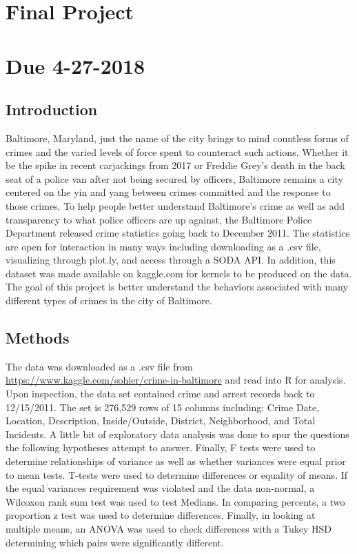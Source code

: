 \documentclass{article}
\newlength\tindent
\renewcommand{\indent}{\hspace*{\tindent}}
\begin{document}
\section*{Final Project}
\section*{Due 4-27-2018}
\subsection*{Introduction}

\indent Baltimore, Maryland, just the name of the city brings to mind countless forms of crimes and the varied levels of force spent to counteract such actions.  Whether it be the spike in recent carjackings from 2017 or Freddie Grey's death in the back seat of a police van after not being secured by officers, Baltimore remains a city centered on the yin and yang between crimes committed and the response to those crimes.  To help people better understand Baltimore's crime as well as add transparency to what police officers are up against, the Baltimore Police Department released crime statistics going back to December 2011.  The statistics are open for interaction in many ways including downloading as a .csv file, visualizing through plot.ly, and access through a SODA API.  In addition, this dataset was made available on kaggle.com for kernels to be produced on the data.  The goal of this project is better understand the behaviors associated with many different types of crimes in the city of Baltimore.  

\subsection*{Methods}

\indent The data was downloaded as a .csv file from \url{https://www.kaggle.com/sohier/crime-in-baltimore} and read into R for analysis.  Upon inspection, the data set contained crime and arrest records back to 12/15/2011.  The set is 276,529 rows of 15 columns including: Crime Date, Location, Description, Inside/Outside, District, Neighborhood, and Total Incidents.  A little bit of exploratory data analysis was done to spur the questions the following hypotheses attempt to answer.  Finally, F tests were used to determine relationships of variance as well as whether variances were equal prior to mean tests.  T-tests were used to determine differences or equality of means.  If the equal variances requirement was violated and the data non-normal, a Wilcoxon rank sum test was used to test Medians.  In comparing percents, a two proportion z test was used to determine differences.  Finally, in looking at multiple means, an ANOVA was used to check differences with a Tukey HSD determining which pairs were significantly different.    
\end{document}
